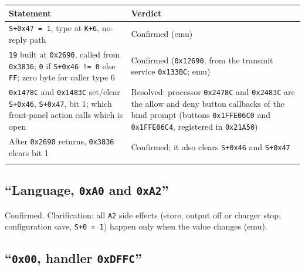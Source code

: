 {\def\LTcaptype{none} %
\begin{longtable}[]{@{}
  >{\raggedright\arraybackslash}p{}
  >{\raggedright\arraybackslash}p{}@{}}
\toprule\noalign{}
\begin{minipage}[b]{\linewidth}\raggedright
Statement
\end{minipage} & \begin{minipage}[b]{\linewidth}\raggedright
Verdict
\end{minipage} \\
\midrule\noalign{}
\endhead
\bottomrule\noalign{}
\endlastfoot
\texttt{S+0x47\ =\ 1}, type at \texttt{K+6}, no-reply path & Confirmed
(emu) \\
\texttt{19} built at \texttt{0x2690}, called from \texttt{0x3836};
\texttt{0} if \texttt{S+0x46\ !=\ 0} else \texttt{FF}; zero byte for
caller type 6 & Confirmed (\texttt{0x12690}, from the transmit service
\texttt{0x133BC}; emu) \\
\texttt{0x1478C} and \texttt{0x1483C} set/clear \texttt{S+0x46},
\texttt{S+0x47}, bit 1; which front-panel action calls which is open &
Resolved: processor \texttt{0x2478C} and \texttt{0x2483C} are the allow
and deny button callbacks of the bind prompt (buttons
\texttt{0x1FFE06C0} and \texttt{0x1FFE06C4}, registered in
\texttt{0x21A50}) \\
After \texttt{0x2690} returns, \texttt{0x3836} clears bit 1 & Confirmed;
it also clears \texttt{S+0x46} and \texttt{S+0x47} \\*
\end{longtable}
}

\subsection{\texorpdfstring{``Language, \texttt{0xA0} and
\texttt{0xA2}''}{``Language, 0xA0 and 0xA2''}}\label{language-0xa0-and-0xa2}

Confirmed. Clarification: all \texttt{A2} side effects (store, output
off or charger stop, configuration save, \texttt{S+0\ =\ 1}) happen only
when the value changes (emu).

\subsection{\texorpdfstring{``\texttt{0x00}, handler
\texttt{0xDFFC}''}{``0x00, handler 0xDFFC''}}\label{x00-handler-0xdffc}

